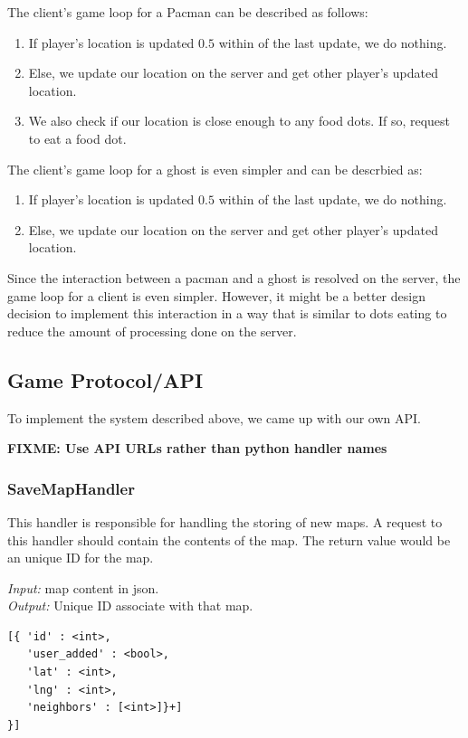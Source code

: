 \documentclass{acm_proc_article-sp}
\newcommand{\FIXME}[1]{{\color{red}\textbf{FIXME: #1}}}
\begin{document}
The client's game loop for a Pacman can be described as follows:

\begin{enumerate}
\item If player's location is updated $0.5$ within of the last update, we do nothing.
\item Else, we update our location on the server and get other player's updated location.
\item We also check if our location is close enough to any food dots. If so, request to eat a food dot.
\end{enumerate}

The client's game loop for a ghost is even simpler and can be descrbied as:

\begin{enumerate}
\item If player's location is updated $0.5$ within of the last update, we do nothing.
\item Else, we update our location on the server and get other player's updated location.
\end{enumerate}

Since the interaction between a pacman and a ghost is resolved on the
server, the game loop for a client is even simpler. However, it might
be a better design decision to implement this interaction in a way
that is similar to dots eating to reduce the amount of processing done
on the server.

\subsection{Game Protocol/API}
To implement the system described above, we came up with our own API.

\FIXME{Use API URLs rather than python handler names}
\subsubsection{SaveMapHandler}
This handler is responsible for handling the storing of new maps. A
request to this handler should contain the contents of the map. The
return value would be an unique ID for the map.

\emph{Input:} map content in json.\\
\emph{Output:} Unique ID associate with that map.

\medskip
\begin{lstlisting}[caption=Map format in json]
[{ 'id' : <int>,
   'user_added' : <bool>,
   'lat' : <int>,
   'lng' : <int>,
   'neighbors' : [<int>]}+]
}]
\end{lstlisting}
\end{document}

